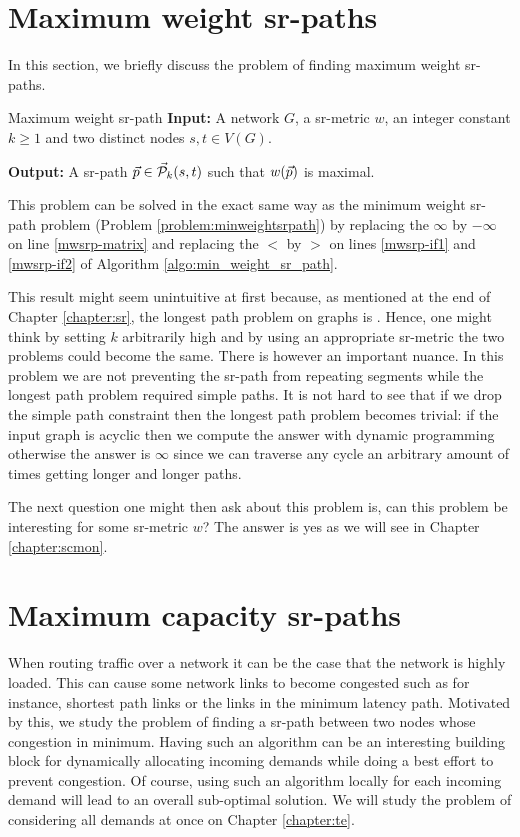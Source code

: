 \section{Maximum weight sr-paths}

In this section, we briefly discuss the problem of finding maximum weight sr-paths. 

\begin{problem}{Maximum weight sr-path}
\label{problem:maxweightsrpath}
\textbf{Input:} A network $G$, a sr-metric $w$, an integer constant $k \geq 1$ and two distinct nodes $s, t \in V(G)$.

\textbf{Output:} A sr-path $\vec{p} \in \mathcal{\vec{P}}_k(s, t)$ such that $w(\vec{p})$ is maximal.
\end{problem}

This problem can be solved in the exact same way as the minimum weight sr-path problem (Problem \ref{problem:minweightsrpath})
by replacing the $\infty$ by $-\infty$ on line \ref{mwsrp-matrix} and replacing the $<$ by $>$ on lines \ref{mwsrp-if1} and
\ref{mwsrp-if2} of Algorithm \ref{algo:min_weight_sr_path}.

This result might seem unintuitive at first because, as mentioned at the end of Chapter \ref{chapter:sr}, the longest path problem on graphs is \NPhard. Hence,
one might think by setting $k$ arbitrarily high and by using an appropriate sr-metric the two problems could become the same. There
is however an important nuance. In this problem we are not preventing the sr-path from repeating segments while the longest path
problem required simple paths. It is not hard to see that if we drop the simple path constraint then the longest path problem becomes trivial:
if the input graph is acyclic then we compute the answer with dynamic programming otherwise the answer is $\infty$ since we can
traverse any cycle an arbitrary amount of times getting longer and longer paths.

The next question one might then ask about this problem is, can this problem be interesting for some sr-metric $w$? The answer
is yes as we will see in Chapter \ref{chapter:scmon}.

\section{Maximum capacity sr-paths}

When routing traffic over a network it can be the case that the network is highly loaded. This can cause some network links
to become congested such as for instance, shortest path links or the links in the minimum latency path. Motivated by this,
we study the problem of finding a sr-path between two nodes whose congestion in minimum. Having such an algorithm can be
an interesting building block for dynamically allocating incoming demands while doing a best effort to prevent congestion.
Of course, using such an algorithm locally for each incoming demand will lead to an overall sub-optimal solution. We will
study the problem of considering all demands at once on Chapter \ref{chapter:te}.

